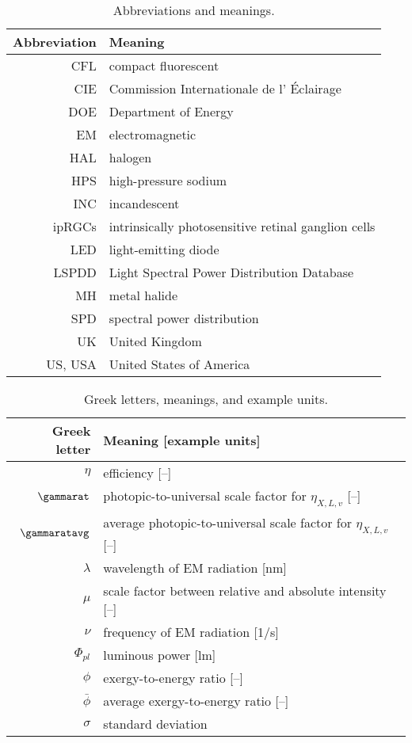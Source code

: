   
\begin{table}
\centering %
\caption{Abbreviations and meanings.}
\begin{tabular}{r l}
\toprule
Abbreviation & Meaning \\
\midrule
CFL & compact fluorescent \\
CIE & Commission Internationale de l' \'{E}clairage \\
DOE & Department of Energy \\
EM & electromagnetic \\
HAL & halogen \\
HPS & high-pressure sodium \\
INC & incandescent \\
ipRGCs & intrinsically photosensitive retinal ganglion cells \\
LED & light-emitting diode \\
LSPDD & Light Spectral Power Distribution Database \\
MH & metal halide \\
SPD & spectral power distribution \\
UK & United Kingdom \\
US, USA & United States of America \\
\bottomrule
\end{tabular}
\label{tab:abbreviations}
\end{table}



\begin{table}
\centering %
\caption{Greek letters, meanings, and example units.}
\begin{tabular}{r l}
  \toprule
  Greek letter & Meaning [example units] \\
  \midrule
  $\eta$ & efficiency [--] \\
  $\gammarat$ & photopic-to-universal scale factor for $\eta_{X,L,v}$ [--] \\
  $\gammaratavg$ & average photopic-to-universal scale factor for $\eta_{X,L,v}$ [--] \\
  $\lambda$ & wavelength of EM radiation [nm] \\
  $\mu$ & scale factor between relative and absolute intensity [--] \\
  $\nu$ & frequency of EM radiation [1/s] \\
  $\Phi_{pl}$ & luminous power [lm] \\
  $\phi$ & exergy-to-energy ratio [--] \\
  $\bar{\phi}$ & average exergy-to-energy ratio [--] \\
  $\sigma$ & standard deviation \\
  \bottomrule
\end{tabular}
\label{tab:greek}
\end{table}


